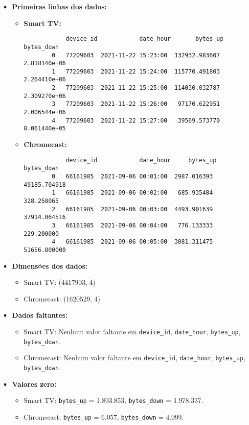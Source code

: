 \begin{itemize}
    \item \textbf{Primeiras linhas dos dados:}
    \begin{itemize}
        \item \textbf{Smart TV:}
        \begin{verbatim}
            device_id            date_hour       bytes_up    bytes_down
        0   77209603  2021-11-22 15:23:00  132932.983607  2.818140e+06
        1   77209603  2021-11-22 15:24:00  115770.491803  2.264410e+06
        2   77209603  2021-11-22 15:25:00  114030.032787  2.309270e+06
        3   77209603  2021-11-22 15:26:00   97170.622951  2.006544e+06
        4   77209603  2021-11-22 15:27:00   39569.573770  8.061440e+05
        \end{verbatim}
        
        \item \textbf{Chromecast:}
        \begin{verbatim}
            device_id            date_hour     bytes_up    bytes_down
        0   66161985  2021-09-06 00:01:00  2987.016393  49185.704918
        1   66161985  2021-09-06 00:02:00   685.935484    328.258065
        2   66161985  2021-09-06 00:03:00  4493.901639  37914.064516
        3   66161985  2021-09-06 00:04:00   776.133333    229.200000
        4   66161985  2021-09-06 00:05:00  3081.311475  51656.800000
        \end{verbatim}
    \end{itemize}
    
    \item \textbf{Dimensões dos dados:}
    \begin{itemize}
        \item Smart TV: (4417903, 4)
        \item Chromecast: (1620529, 4)
    \end{itemize}

    \item \textbf{Dados faltantes:}
    \begin{itemize}
        \item Smart TV: Nenhum valor faltante em \texttt{device\_id}, \texttt{date\_hour}, \texttt{bytes\_up}, \texttt{bytes\_down}.
        \item Chromecast: Nenhum valor faltante em \texttt{device\_id}, \texttt{date\_hour}, \texttt{bytes\_up}, \texttt{bytes\_down}.
    \end{itemize}

    \item \textbf{Valores zero:}
    \begin{itemize}
        \item Smart TV: \texttt{bytes\_up} = 1.803.853, \texttt{bytes\_down} = 1.978.337.
        \item Chromecast: \texttt{bytes\_up} = 6.057, \texttt{bytes\_down} = 4.099.
    \end{itemize}


\end{itemize}
